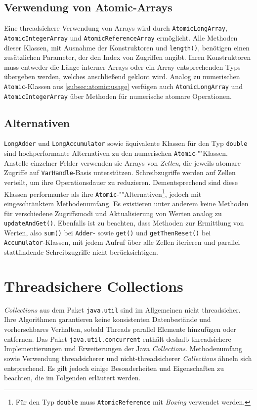 \documentclass[a4paper, 11pt]{article}
\begin{document}
\subsection{Verwendung von Atomic-Arrays}
\label{subsec:atomic:usagearray}

Eine threadsichere Verwendung von Arrays wird durch \verb|AtomicLongArray|, \verb|AtomicIntegerArray| und \verb|AtomicReferenceArray| ermöglicht.
Alle Methoden dieser Klassen, mit Ausnahme der Konstruktoren und \verb|length()|, benötigen einen zusätzlichen Parameter, der den Index von Zugriffen angibt.
Ihren Konstruktoren muss entweder die Länge interner Arrays oder ein Array entsprechenden Typs übergeben werden, welches anschließend geklont wird.
Analog zu numerischen \verb|Atomic|-Klassen aus \autoref{subsec:atomic:usage} verfügen auch \verb|AtomicLongArray| und \verb|AtomicIntegerArray| über Methoden für numerische atomare Operationen.

\subsection{Alternativen}
\label{subsec:atomic:alternatives}

\verb|LongAdder| und \verb|LongAccumulator| sowie äquivalente Klassen für den Typ \verb|double| sind hochperformante Alternativen zu den numerischen \verb|Atomic|-""Klassen.
Anstelle einzelner Felder verwenden sie Arrays von \textit{Zellen}, die jeweils atomare Zugriffe auf \verb|VarHandle|-Basis unterstützen.
Schreibzugriffe werden auf Zellen verteilt, um ihre Operationsdauer zu reduzieren.
Dementsprechend sind diese Klassen performanter als ihre \verb|Atomic|-""Alternativen\footnote{Für den Typ \verb|double| muss \verb|AtomicReference| mit \textit{Boxing} verwendet werden.}, jedoch mit eingeschränktem Methodenumfang.
Es existieren unter anderem keine Methoden für verschiedene Zugriffsmodi und Aktualisierung von Werten analog zu \verb|updateAndGet()|.
Ebenfalls ist zu beachten, dass Methoden zur Ermittlung von Werten, also \verb|sum()| bei \verb|Adder|- sowie \verb|get()| und \verb|getThenReset()| bei \verb|Accumulator|-Klassen, mit jedem Aufruf über alle Zellen iterieren und parallel stattfindende Schreibzugriffe nicht berücksichtigen.


\section{Threadsichere Collections}
\label{sec:collections}

\textit{Collections} aus dem Paket \verb|java.util| sind im Allgemeinen nicht threadsicher.
Ihre Algorithmen garantieren keine konsistenten Datenbestände und vorhersehbares Verhalten, sobald Threads parallel Elemente hinzufügen oder entfernen.
Das Paket \verb|java.util.concurrent| enthält deshalb threadsichere Implementierungen und Erweiterungen der Java \textit{Collections}.
Methodenumfang sowie Verwendung threadsicherer und nicht-threadsicherer \textit{Collections} ähneln sich entsprechend.
Es gilt jedoch einige Besonderheiten und Eigenschaften zu beachten, die im Folgenden erläutert werden.
\end{document}
